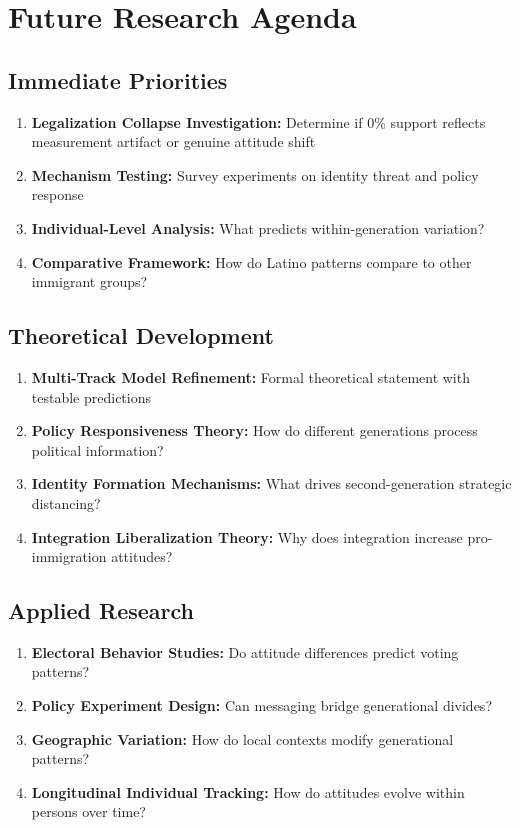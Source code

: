 \documentclass[11pt,letterpaper]{article}
\begin{document}
\section{Future Research Agenda}

\subsection{Immediate Priorities}
\begin{enumerate}
    \item \textbf{Legalization Collapse Investigation:} Determine if 0\% support reflects measurement artifact or genuine attitude shift
    \item \textbf{Mechanism Testing:} Survey experiments on identity threat and policy response
    \item \textbf{Individual-Level Analysis:} What predicts within-generation variation?
    \item \textbf{Comparative Framework:} How do Latino patterns compare to other immigrant groups?
\end{enumerate}

\subsection{Theoretical Development}
\begin{enumerate}
    \item \textbf{Multi-Track Model Refinement:} Formal theoretical statement with testable predictions
    \item \textbf{Policy Responsiveness Theory:} How do different generations process political information?
    \item \textbf{Identity Formation Mechanisms:} What drives second-generation strategic distancing?
    \item \textbf{Integration Liberalization Theory:} Why does integration increase pro-immigration attitudes?
\end{enumerate}

\subsection{Applied Research}
\begin{enumerate}
    \item \textbf{Electoral Behavior Studies:} Do attitude differences predict voting patterns?
    \item \textbf{Policy Experiment Design:} Can messaging bridge generational divides?
    \item \textbf{Geographic Variation:} How do local contexts modify generational patterns?
    \item \textbf{Longitudinal Individual Tracking:} How do attitudes evolve within persons over time?
\end{enumerate}
\end{document}
